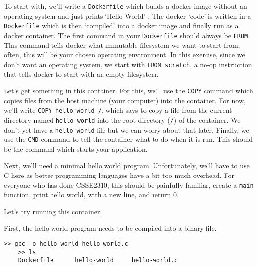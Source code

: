 \documentclass{csse4400}
\begin{document}
To start with, we'll write a \texttt{Dockerfile} which builds a docker image without an operating system and just prints `Hello World'
\cite{docker-from-scratch}.
The docker `code' is written in a \texttt{Dockerfile} which is then `compiled' into a docker image and finally run as a docker container.
The first command in your \texttt{Dockerfile} should always be \texttt{FROM}.
This command tells docker what immutable filesystem we want to start from, often, this will be your chosen operating environment.
In this exercise, since we don't want an operating system, we start with \texttt{FROM scratch},
a no-op instruction that tells docker to start with an empty filesystem.

Let's get something in this container.
For this, we'll use the \texttt{COPY} command which copies files from the host machine (your computer) into the container.
For now, we'll write \texttt{COPY hello-world /}, which says to copy a file from the current directory named \texttt{hello-world} into the root directory (\texttt{/})
of the container.
We don't yet have a \texttt{hello-world} file but we can worry about that later.
Finally, we use the \texttt{CMD} command to tell the container what to do when it is run.
This should be the command which starts your application.

\begin{shaded*}

\end{shaded*}


Next, we'll need a minimal hello world program.
Unfortunately, we'll have to use C here as better programming languages have a bit too much overhead.
For everyone who has done CSSE2310, this should be painfully familiar, create a \texttt{main} function, print hello world, with a new line, and return 0.

\begin{shaded*}

\end{shaded*}

Let's try running this container.

First, the hello world program needs to be compiled into a binary file.

\begin{shaded*}
\begin{lstlisting}[language=shell]
    >> gcc -o hello-world hello-world.c
    >> ls
    Dockerfile      hello-world     hello-world.c
\end{lstlisting}
\end{shaded*}
\end{document}
